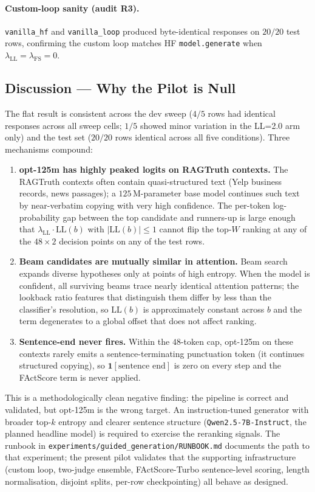 \paragraph{Custom-loop sanity (audit R3).} \texttt{vanilla\_hf} and
\texttt{vanilla\_loop} produced byte-identical responses on $20/20$ test
rows, confirming the custom loop matches HF \texttt{model.generate} when
$\lambda_{\text{LL}}=\lambda_{\text{FS}}=0$.

\subsection{Discussion --- Why the Pilot is Null}

The flat result is consistent across the dev sweep ($4/5$ rows had identical
responses across all sweep cells; $1/5$ showed minor variation in the LL=2.0
arm only) and the test set ($20/20$ rows identical across all five
conditions).  Three mechanisms compound:

\begin{enumerate}
\item \textbf{opt-125m has highly peaked logits on RAGTruth contexts.} The
RAGTruth contexts often contain quasi-structured text (Yelp business records,
news passages); a $125$\,M-parameter base model continues such text by
near-verbatim copying with very high confidence. The per-token log-probability
gap between the top candidate and runners-up is large enough that
$\lambda_{\text{LL}} \cdot \mathrm{LL}(b)$ with $|\mathrm{LL}(b)| \leq 1$
cannot flip the top-$W$ ranking at any of the $48 \times 2$ decision points
on any of the test rows.
\item \textbf{Beam candidates are mutually similar in attention.} Beam search
expands diverse hypotheses only at points of high entropy.  When the model
is confident, all surviving beams trace nearly identical attention patterns;
the lookback ratio features that distinguish them differ by less than the
classifier's resolution, so $\mathrm{LL}(b)$ is approximately constant
across $b$ and the term degenerates to a global offset that does not affect
ranking.
\item \textbf{Sentence-end never fires.} Within the $48$-token cap, opt-125m
on these contexts rarely emits a sentence-terminating punctuation token
(it continues structured copying), so $\mathbf{1}[\text{sentence end}]$ is
zero on every step and the FActScore term is never applied.
\end{enumerate}

This is a methodologically clean negative finding: the pipeline is correct
and validated, but opt-125m is the wrong target.  An instruction-tuned
generator with broader top-$k$ entropy and clearer sentence structure
(\texttt{Qwen2.5-7B-Instruct}, the planned headline model) is required to
exercise the reranking signals.  The runbook in
\texttt{experiments/guided\_generation/RUNBOOK.md} documents the path to
that experiment; the present pilot validates that the supporting
infrastructure (custom loop, two-judge ensemble, FActScore-Turbo
sentence-level scoring, length normalisation, disjoint splits, per-row
checkpointing) all behave as designed.

